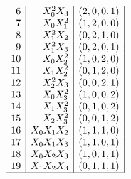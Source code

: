 \begin{table}
\begin{tcolorbox}
\begin{tcbitemize}[raster columns=3,raster equal height,
  colframe=red!75!black,colback=red!5!white,fonttitle=\bfseries]
$$\begin{array}{|r|r|r|}
6 & X_0^2X_3 & ( 2, 0, 0, 1 )\\
7 & X_0X_1^2 & ( 1, 2, 0, 0 )\\
8 & X_1^2X_2 & ( 0, 2, 1, 0 )\\
9 & X_1^2X_3 & ( 0, 2, 0, 1 )\\
10 & X_0X_2^2 & ( 1, 0, 2, 0 )\\
11 & X_1X_2^2 & ( 0, 1, 2, 0 )\\
12 & X_2^2X_3 & ( 0, 0, 2, 1 )\\
13 & X_0X_3^2 & ( 1, 0, 0, 2 )\\
14 & X_1X_3^2 & ( 0, 1, 0, 2 )\\
15 & X_2X_3^2 & ( 0, 0, 1, 2 )\\
16 & X_0X_1X_2 & ( 1, 1, 1, 0 )\\
17 & X_0X_1X_3 & ( 1, 1, 0, 1 )\\
18 & X_0X_2X_3 & ( 1, 0, 1, 1 )\\
19 & X_1X_2X_3 & ( 0, 1, 1, 1 )\\
\hline
\end{array}
$$
\end{tcbitemize}
\end{tcolorbox}
\caption{\label{tab:PG3monomials}Monomial Ordering of Partition Type in Three-Space}
\end{table}
